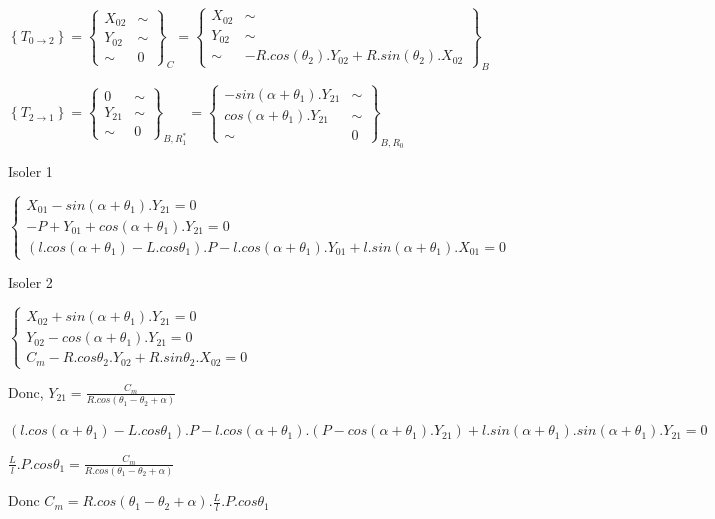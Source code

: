 {$\left\{T_{0\rightarrow 2}\right\}=\left\{\begin{array}{cc}
X_{02} & \sim \\
Y_{02} & \sim \\
\sim & 0
\end{array}\right\}_C=
\left\{\begin{array}{cc}
X_{02} & \sim \\
Y_{02} & \sim \\
\sim & -R.cos(\theta_2).Y_{02}+R.sin(\theta_2).X_{02}
\end{array}\right\}_B$

$\left\{T_{2\rightarrow 1}\right\}=\left\{\begin{array}{cc}
0 & \sim \\
Y_{21} & \sim \\
\sim & 0
\end{array}\right\}_{B,R_1^*}=
\left\{\begin{array}{cc}
-sin(\alpha+\theta_1).Y_{21} & \sim \\
cos(\alpha+\theta_1).Y_{21} & \sim \\
\sim & 0
\end{array}\right\}_{B,R_0}$

Isoler 1

$\left\{\begin{array}{l}
X_{01}-sin(\alpha+\theta_1).Y_{21}=0 \\
-P+Y_{01}+cos(\alpha+\theta_1).Y_{21}=0 \\
(l.cos(\alpha+\theta_1)-L.cos\theta_1).P-l.cos(\alpha+\theta_1).Y_{01}+l.sin(\alpha+\theta_1).X_{01}=0
\end{array}\right.$

Isoler 2

$\left\{\begin{array}{l}
X_{02}+sin(\alpha+\theta_1).Y_{21}=0 \\
Y_{02}-cos(\alpha+\theta_1).Y_{21}=0 \\
C_m-R.cos\theta_2.Y_{02}+R.sin\theta_2.X_{02}=0
\end{array}\right.$

Donc, $Y_{21}=\frac{C_m}{R.cos(\theta_1-\theta_2+\alpha)}$

$(l.cos(\alpha+\theta_1)-L.cos\theta_1).P-l.cos(\alpha+\theta_1).(P-cos(\alpha+\theta_1).Y_{21})+l.sin(\alpha+\theta_1).sin(\alpha+\theta_1).Y_{21}=0$

$\frac{L}{l}.P.cos\theta_1=\frac{C_m}{R.cos(\theta_1-\theta_2+\alpha)}$

Donc $C_m=R.cos(\theta_1-\theta_2+\alpha).\frac{L}{l}.P.cos\theta_1$
}

